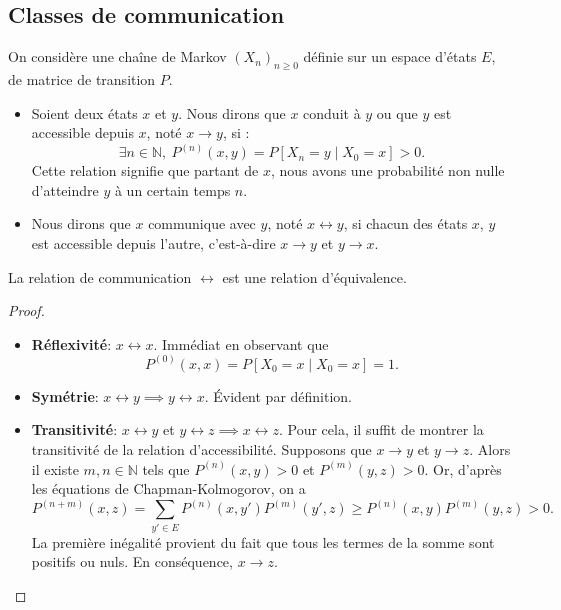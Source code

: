 \subsection{Classes de communication}
On considère une chaîne de Markov $(X_n)_{n \geq 0}$ définie sur un espace d’états $E$, de matrice de transition $P$.

\begin{definition}[7.1]

\begin{itemize}
    \item Soient deux états $x$ et $y$. Nous dirons que $x$ conduit à $y$ ou que $y$ est accessible depuis $x$, noté $x \to y$, si :
    \[
    \exists n \in \mathbb{N},\ P^{(n)}(x, y) = P[X_n = y \mid X_0 = x] > 0.
    \]
    Cette relation signifie que partant de $x$, nous avons une probabilité non nulle d’atteindre $y$ à un certain temps $n$.

    \item Nous dirons que $x$ communique avec $y$, noté $x \leftrightarrow y$, si chacun des états $x$, $y$ est accessible depuis l’autre, c’est-à-dire $x \to y$ et $y \to x$.
\end{itemize}
\end{definition}



\begin{proposition}
La relation de communication $\leftrightarrow$ est une relation d’équivalence.
\end{proposition}

\begin{proof}
\begin{itemize}
    \item \textbf{Réflexivité}: $x \leftrightarrow x$. Immédiat en observant que 
    \[
    P^{(0)}(x, x) = P[X_0 = x \mid X_0 = x] = 1.
    \]

    \item \textbf{Symétrie}: $x \leftrightarrow y \implies y \leftrightarrow x$. Évident par définition.

    \item \textbf{Transitivité}: $x \leftrightarrow y$ et $y \leftrightarrow z \implies x \leftrightarrow z$. Pour cela, il suffit de montrer la transitivité de la relation d’accessibilité. Supposons que $x \to y$ et $y \to z$. Alors il existe $m, n \in \mathbb{N}$ tels que $P^{(n)}(x, y) > 0$ et $P^{(m)}(y, z) > 0$. Or, d’après les équations de Chapman-Kolmogorov, on a 
    \[
    P^{(n+m)}(x, z) = \sum_{y' \in E} P^{(n)}(x, y')P^{(m)}(y', z) \geq P^{(n)}(x, y)P^{(m)}(y, z) > 0.
    \]
    La première inégalité provient du fait que tous les termes de la somme sont positifs ou nuls. En conséquence, $x \to z$.
\end{itemize}
\end{proof}



